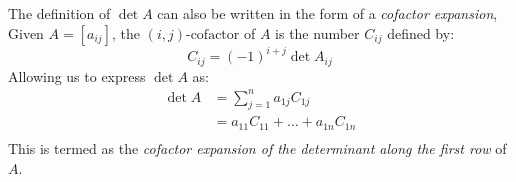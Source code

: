 \documentclass[12pt letter]{report}
\begin{document}

The definition of $\det A$ can also be written in the form of a \textit{cofactor expansion}, Given $A = \left[ a_{ij}
    \right] $, the $ \left( i, j \right)\text{-cofactor} $ of $A$ is the number $C_{ij}$ defined by:
\[
  C_{ij} = \left( -1 \right)^{i+j} \det A_{ij}
\]
Allowing us to express $\det A$ as:
\begin{align*}
  \det A & = \displaystyle\sum_{j=1}^{n} a_{1j} C_{1j} \\
         & = a_{11} C_{11} + \ldots + a_{1n} C_{1n}    \\
\end{align*}
This is termed as the \textit{cofactor expansion of the determinant along the first row} of $A$.
\end{document}
